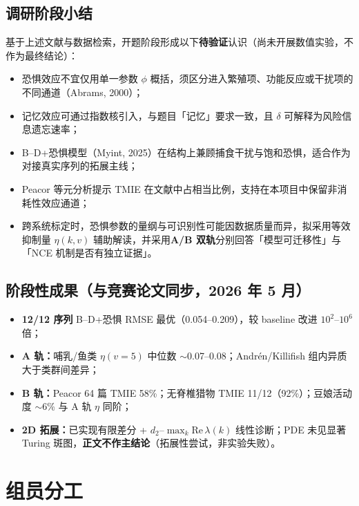 \documentclass[12pt,a4paper]{ctexart}
\begin{document}
\subsection{调研阶段小结}

基于上述文献与数据检索，开题阶段形成以下\textbf{待验证}认识（尚未开展数值实验，不作为最终结论）：

\begin{itemize}[leftmargin=2em]
  \item 恐惧效应不宜仅用单一参数 $\phi$ 概括，须区分进入繁殖项、功能反应或干扰项的不同通道（Abrams, 2000）；
  \item 记忆效应可通过指数核引入，与题目「记忆」要求一致，且 $\delta$ 可解释为风险信息遗忘速率；
  \item B--D+恐惧模型（Myint, 2025）在结构上兼顾捕食干扰与饱和恐惧，适合作为对接真实序列的拓展主线；
  \item Peacor 等元分析提示 TMIE 在文献中占相当比例，支持在本项目中保留非消耗性效应通道；
  \item 跨系统标定时，恐惧参数的量纲与可识别性可能因数据质量而异，拟采用等效抑制量 $\eta(k,v)$ 辅助解读，并采用\textbf{A/B 双轨}分别回答「模型可迁移性」与「NCE 机制是否有独立证据」。
\end{itemize}

\subsection{阶段性成果（与竞赛论文同步，2026 年 5 月）}

\begin{itemize}[leftmargin=2em]
  \item \textbf{12/12 序列} B--D+恐惧 RMSE 最优（0.054--0.209），较 baseline 改进 $10^2$--$10^6$ 倍；
  \item \textbf{A 轨：}哺乳/鱼类 $\eta(v=5)$ 中位数 $\sim$0.07--0.08；Andrén/Killifish 组内异质大于类群间差异；
  \item \textbf{B 轨：}Peacor 64 篇 TMIE 58\%；无脊椎猎物 TMIE 11/12（92\%）；豆娘活动度 $\sim$6\% 与 A 轨 $\eta$ 同阶；
  \item \textbf{2D 拓展：}已实现有限差分 + $d_2$--$\max_k\mathrm{Re}\,\lambda(k)$ 线性诊断；PDE 未见显著 Turing 斑图，\textbf{正文不作主结论}（拓展性尝试，非实验失败）。
\end{itemize}

\section{组员分工}
\end{document}
